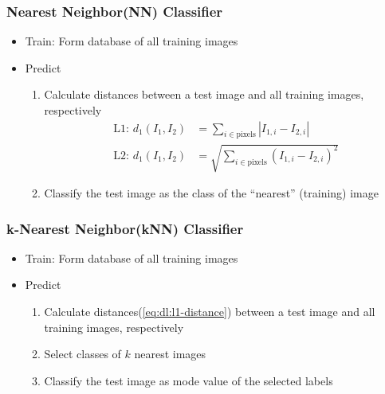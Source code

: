 \subsubsection*{Nearest Neighbor(NN) Classifier}
\begin{itemize}
    \item Train: Form database of all training images
    \item Predict
    \begin{enumerate}
        \item Calculate distances between a test image and all training images, respectively
        \begin{equation}\label{eq:dl:l1-distance}\begin{aligned}
            \text{L1: }d_1(I_1,I_2)&=\sum_{i\in\text{pixels}}|I_{1,i}-I_{2,i}|\\
            \text{L2: }d_1(I_1,I_2)&=\sqrt{\sum_{i\in\text{pixels}}(I_{1,i}-I_{2,i})^2}
        \end{aligned}\end{equation}
        \item Classify the test image as the class of the ``nearest'' (training) image
    \end{enumerate}
\end{itemize}

\subsubsection*{k-Nearest Neighbor(kNN) Classifier}
\begin{itemize}
    \item Train: Form database of all training images
    \item Predict
    \begin{enumerate}
        \item Calculate distances(\ref{eq:dl:l1-distance}) between a test image and all training images, respectively
        \item Select classes of $k$ nearest images
        \item Classify the test image as mode value of the selected labels
    \end{enumerate}
\end{itemize}

